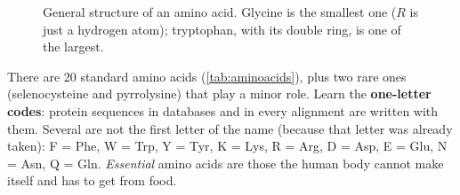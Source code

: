 \documentclass[11pt, oneside]{book}
\begin{document}
\begin{figure}[htbp]
\centering
{\Large{}}
\qquad\qquad
{}
\caption{General structure of an amino acid. Glycine is the smallest one
($R$ is just a hydrogen atom); tryptophan, with its double ring, is one of
the largest.}
\label{fig:aminoacid}
\end{figure}

There are 20 standard amino acids (\cref{tab:aminoacids}), plus two rare ones
(selenocysteine and pyrrolysine) that play a minor role. Learn the
\textbf{one-letter codes}: protein sequences in databases and in every
alignment are written with them. Several are not the first letter of the name
(because that letter was already taken): F = Phe, W = Trp, Y = Tyr, K = Lys,
R = Arg, D = Asp, E = Glu, N = Asn, Q = Gln. \emph{Essential} amino acids are
those the human body cannot make itself and has to get from food.
\end{document}
